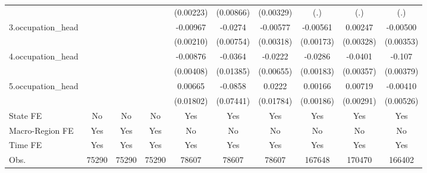 \begin{table}[htbp]
{\begin{tabular}{l*{9}{c}}
            &                     &                     &                     &   (0.00223)         &   (0.00866)         &   (0.00329)         &         (.)         &         (.)         &         (.)         \\
3.occupation_head&                     &                     &                     &    -0.00967\sym{***}&     -0.0274\sym{***}&    -0.00577\sym{*}  &    -0.00561\sym{***}&     0.00247         &    -0.00500         \\
            &                     &                     &                     &   (0.00210)         &   (0.00754)         &   (0.00318)         &   (0.00173)         &   (0.00328)         &   (0.00353)         \\
4.occupation_head&                     &                     &                     &    -0.00876\sym{**} &     -0.0364\sym{***}&     -0.0222\sym{***}&     -0.0286\sym{***}&     -0.0401\sym{***}&      -0.107\sym{***}\\
            &                     &                     &                     &   (0.00408)         &   (0.01385)         &   (0.00655)         &   (0.00183)         &   (0.00357)         &   (0.00379)         \\
5.occupation_head&                     &                     &                     &     0.00665         &     -0.0858         &      0.0222         &     0.00166         &     0.00719\sym{**} &    -0.00410         \\
            &                     &                     &                     &   (0.01802)         &   (0.07441)         &   (0.01784)         &   (0.00186)         &   (0.00291)         &   (0.00526)         \\
State FE    &          No         &          No         &          No         &         Yes         &         Yes         &         Yes         &         Yes         &         Yes         &         Yes         \\
Macro-Region FE &         Yes         &         Yes         &         Yes         &          No         &          No         &          No         &          No         &          No         &          No         \\
Time FE     &         Yes         &         Yes         &         Yes         &         Yes         &         Yes         &         Yes         &         Yes         &         Yes         &         Yes         \\
\hline
Obs.        &       75290         &       75290         &       75290         &       78607         &       78607         &       78607         &      167648         &      170470         &      166402         \\

\end{tabular}}
\end{table}
